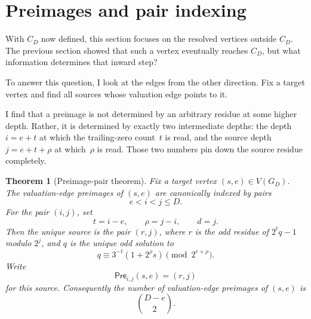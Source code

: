 \documentclass[11pt]{amsart}
\newtheorem{theorem}{Theorem}[section]
\theoremstyle{definition}
\theoremstyle{remark}
\newcommand{\GD}{G_D}
\newcommand{\Pre}{\mathsf{Pre}}
\begin{document}
\section{Preimages and pair indexing}\label{sec:preimages}
With $C_D$ now defined, this section focuses on the resolved vertices outside $C_D$. The previous section showed that such a vertex eventually reaches $C_D$, but what information determines that inward step?

To answer this question, I look at the edges from the other direction. Fix a target vertex and find all sources whose valuation edge points to it.

I find that a preimage is not determined by an arbitrary residue at some higher depth. Rather, it is determined by exactly two intermediate depths: the depth $i=e+t$ at which the trailing-zero count~$t$ is read, and the source depth $j=e+t+\rho$ at which~$\rho$ is read.  Those two numbers pin down the source residue completely.

\begin{theorem}[Preimage-pair theorem]\label{thm:preimage}
Fix a target vertex $(s,e)\in V(\GD)$.  The valuation-edge preimages
of $(s,e)$ are canonically indexed by pairs
\[
e<i<j\le D.
\]
For the pair $(i,j)$, set
\[
t=i-e,
\qquad
\rho=j-i,
\qquad
d=j.
\]
Then the unique source is the pair $(r,j)$, where \(r\) is the odd residue
of \(2^tq-1\) modulo \(2^j\), and \(q\) is the unique odd solution to
\[
q\equiv 3^{-t}(1+2^\rho s)\pmod {2^{e+\rho}}.
\]
Write
\[
\Pre_{i,j}(s,e)=(r,j)
\]
for this source.  Consequently the number of valuation-edge preimages
of \((s,e)\) is
\[
\binom{D-e}{2}.
\]
\end{theorem}
\end{document}

